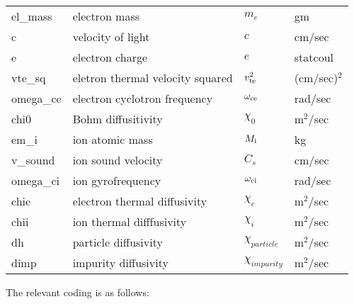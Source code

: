 \documentclass{article}    %
\begin{document}
\begin{tabular}{llll}
el\_mass 	&electron mass    			&$m_e$ 			&gm\\
c       	&velocity of light 			&$c$ 			&cm/sec\\
e       	&electron charge  			&$e$ 			&statcoul\\
vte\_sq 	&eletron thermal velocity squared 	&$v_{\rm te}^2$ 	&(cm/sec)$^{2}$\\
omega\_ce 	&electron cyclotron frequency 		&$\omega_{\rm ce}$ 	&rad/sec\\
chi0 		&Bohm diffusitivity 			&$\chi_0$ 		&m$^{2}/$sec\\
em\_i 		&ion atomic mass  			&$M_{\rm i}$ 		&kg\\
v\_sound 	&ion sound velocity			&$C_{s}$ 		&cm/sec\\ 
omega\_ci       &ion gyrofrequency			&$\omega_{\rm ci}$ 	&rad/sec\\
chie            &electron thermal diffusivity           &$\chi_{e}$ 		&m$^{2}/$sec\\
chii		&ion thermal difffusivity		&$\chi_{i}$ 		&m$^{2}/$sec\\
dh		&particle diffusivity			&$\chi_{particle}$ 	&m$^{2}/$sec\\ 
dimp            &impurity diffusivity			&$\chi_{impurity}$      &m$^{2}/$sec
\end{tabular}
\vskip8pt

The relevant coding is as follows:
\end{document}
